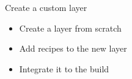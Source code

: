 \setuplabframe
{Create a custom layer}
{
  \begin{itemize}
    \item Create a layer from scratch
    \item Add recipes to the new layer
    \item Integrate it to the build
  \end{itemize}
}
